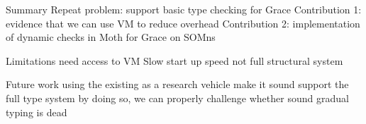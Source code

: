 \begin{outline}

\1 Summary
    \2 Repeat problem: support basic type checking for Grace
    \2 Contribution 1: evidence that we can use VM to reduce overhead
    \2 Contribution 2: implementation of dynamic checks in Moth for Grace on SOMns

\1 Limitations
    \2 need access to VM
    \2 Slow start up speed
    \2 not full structural system

\1 Future work
    \2 using the existing as a research vehicle
    \2 make it sound
    \2 support the full type system
    \3 by doing so, we can properly challenge whether sound gradual typing is dead

\end{outline}